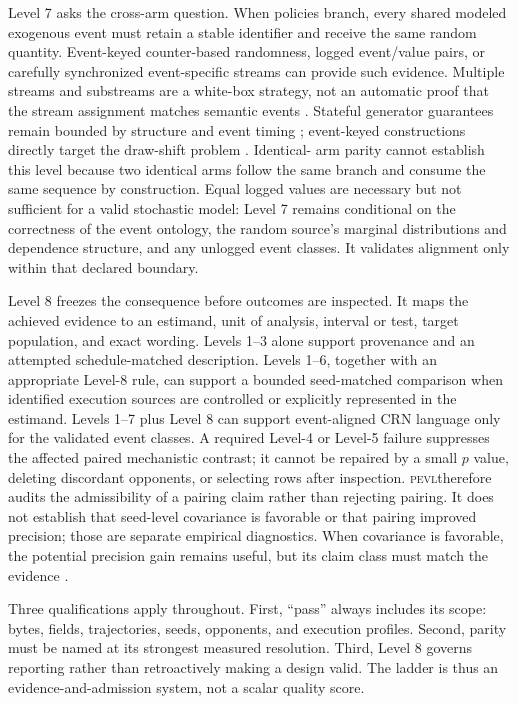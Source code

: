 \documentclass[aps,reprint,superscriptaddress,longbibliography,floatfix]{revtex4-2}
\newcommand{\PEVL}{\textsc{pevl}}
\begin{document}
Level 7 asks the cross-arm question.  When policies branch, every shared
modeled exogenous event must retain a stable identifier and receive the same
random quantity.  Event-keyed counter-based randomness, logged event/value
pairs, or carefully synchronized event-specific streams can provide such
evidence.  Multiple streams and substreams are a white-box strategy, not an
automatic proof that the stream assignment matches semantic events
\cite{lecuyer2002streams}.  Stateful generator guarantees remain bounded by
structure and event timing \cite{glasserman1992crn}; event-keyed constructions
directly target the draw-shift problem \cite{buffalo2026eventkeyed}.  Identical-
arm parity cannot establish this level because two identical arms follow the
same branch and consume the same sequence by construction.
Equal logged values are necessary but not sufficient for a valid stochastic
model: Level 7 remains conditional on the correctness of the event ontology,
the random source's marginal distributions and dependence structure, and any
unlogged event classes.  It validates alignment only within that declared
boundary.

Level 8 freezes the consequence before outcomes are inspected.  It maps the
achieved evidence to an estimand, unit of analysis, interval or test, target
population, and exact wording.  Levels 1--3 alone support provenance and an
attempted schedule-matched description.  Levels 1--6, together with an
appropriate Level-8 rule, can support a bounded seed-matched comparison when
identified execution sources are controlled or explicitly represented in the
estimand.  Levels 1--7 plus Level 8 can support
event-aligned CRN language only for the validated event classes.  A required
Level-4 or Level-5 failure suppresses the affected paired mechanistic contrast;
it cannot be repaired by a small $p$ value, deleting discordant opponents, or
selecting rows after inspection.  \PEVL therefore audits the admissibility of a
pairing claim rather than rejecting pairing.  It does not establish that
seed-level covariance is favorable or that pairing improved precision; those
are separate empirical diagnostics.  When covariance is favorable, the
potential precision gain remains useful, but its claim class must match the
evidence \cite{sharma2025pairedseeds}.

Three qualifications apply throughout.  First, ``pass'' always includes its
scope: bytes, fields, trajectories, seeds, opponents, and execution profiles.
Second, parity must be named at its strongest measured resolution.  Third,
Level 8 governs reporting rather than retroactively making a design valid.  The
ladder is thus an evidence-and-admission system, not a scalar quality score.
\end{document}
